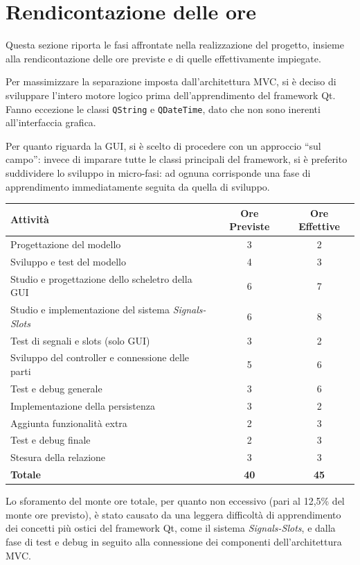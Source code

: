 \section{Rendicontazione delle ore}

Questa sezione riporta le fasi affrontate nella realizzazione del progetto, insieme alla rendicontazione delle ore previste e di quelle effettivamente impiegate.

Per massimizzare la separazione imposta dall'architettura MVC, si è deciso di sviluppare l'intero motore logico prima dell'apprendimento del framework Qt. Fanno eccezione le classi \texttt{QString} e \texttt{QDateTime}, dato che non sono inerenti all'interfaccia grafica.

Per quanto riguarda la GUI, si è scelto di procedere con un approccio ``sul campo'': invece di imparare tutte le classi principali del framework, si è preferito suddividere lo sviluppo in micro-fasi: ad ognuna corrisponde una fase di apprendimento immediatamente seguita da quella di sviluppo.

\begin{table}[h!]
\centering
\renewcommand{\arraystretch}{1.3}
\begin{tabular}{|l|c|c|}
\hline
\textbf{Attività} & \textbf{Ore Previste} & \textbf{Ore Effettive} \\
\hline
Progettazione del modello & 3 & 2 \\
\hline
Sviluppo e test del modello & 4 & 3 \\
\hline
Studio e progettazione dello scheletro della GUI & 6 & 7 \\
\hline
Studio e implementazione del sistema \textit{Signals-Slots} & 6 & 8 \\
\hline
Test di segnali e slots (solo GUI) & 3 & 2 \\
\hline
Sviluppo del controller e connessione delle parti & 5 & 6 \\
\hline
Test e debug generale & 3 & 6 \\
\hline
Implementazione della persistenza & 3 & 2 \\
\hline
Aggiunta funzionalità extra & 2 & 3 \\
\hline
Test e debug finale & 2 & 3 \\
\hline
Stesura della relazione & 3 & 3 \\
\hline\hline
\textbf{Totale}  & \textbf{40} & \textbf{45} \\
\hline
\end{tabular}
\end{table}

Lo sforamento del monte ore totale, per quanto non eccessivo (pari al 12,5\% del monte ore previsto),
è stato causato da una leggera difficoltà di apprendimento dei concetti più ostici del framework
Qt, come il sistema \textit{Signals-Slots}, e dalla fase di test e debug in seguito alla connessione
dei componenti dell'architettura MVC.